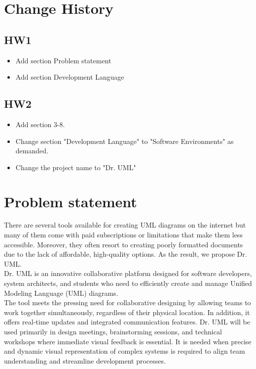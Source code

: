 \documentclass[12pt]{article}
\begin{document}
\begin{CJK*}{UTF8}{bsmi} %
\maketitlepage
\end{CJK*}



\section{Change History}
\subsection{HW1}
\begin{itemize}
    \item Add section Problem statement
    \item Add section Development Language
\end{itemize}
\subsection{HW2}
\begin{itemize}
    \item Add section 3-8.
    \item Change section "Development Language" to "Software Environments" as demanded.
    \item Change the project name to "Dr. UML"
\end{itemize}




\section{Problem statement}


There are several tools available for creating UML diagrams on the internet but many of them come with paid subscriptions or limitations that make them less accessible. Moreover, they often resort to creating poorly formatted documents due to the lack of affordable, high-quality options. As the result, we propose Dr. UML.\\

Dr. UML is an innovative collaborative platform designed for software developers, system architects, and students who need to efficiently create and manage Unified Modeling Language (UML) diagrams.\\

The tool meets the pressing need for collaborative designing by allowing teams to work together simultaneously, regardless of their physical location. In addition, it offers real-time updates and integrated communication features. Dr. UML will be used primarily in design meetings, brainstorming sessions, and technical workshops where immediate visual feedback is essential. It is needed when precise and dynamic visual representation of complex systems is required to align team understanding and streamline development processes.\\
\end{document}
